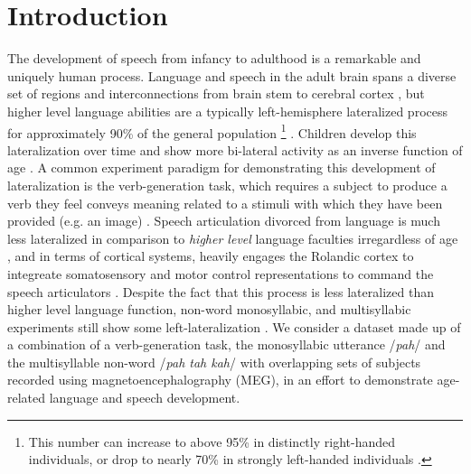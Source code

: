 \documentclass[utf8]{frontiersSCNS} %
\begin{document}
\section{Introduction}

The development of speech from infancy to adulthood is a remarkable and uniquely human process. Language and speech in the adult brain spans a diverse set of regions and interconnections from brain stem to cerebral cortex \cite{GuentherBook, Tourville2011, Hillis}, but higher level language abilities are a typically left-hemisphere lateralized process for approximately 90\% of the general population \footnote{This number can increase to above 95\% in distinctly right-handed individuals, or drop to nearly 70\% in strongly left-handed individuals \cite{GuentherBook}.} \cite{GuentherBook, Kadis2011, Yu2014}. Children develop this lateralization over time and show more bi-lateral activity as an inverse function of age \cite{Kadis2011, Ressel2008}. A common experiment paradigm for demonstrating this development of lateralization is the verb-generation task, which requires a subject to produce a verb they feel conveys meaning related to a stimuli with which they have been provided (e.g. an image) \cite{Kadis2011}. Speech articulation divorced from language is much less lateralized in comparison to {\em higher level} language faculties irregardless of age \cite{GuentherBook}, and in terms of cortical systems, heavily engages the Rolandic cortex to integreate somatosensory and motor control representations to command the speech articulators \cite{GuentherBook}. Despite the fact that this process is less lateralized than higher level language function, non-word monosyllabic, and multisyllabic experiments still show some left-lateralization \cite{Ghosh2008a}. We consider a dataset made up of a combination of a verb-generation task, the monosyllabic utterance /{\em pah}/ and the multisyllable non-word /{\em pah tah kah}/ with overlapping sets of subjects recorded using magnetoencephalography (MEG), in an effort to demonstrate age-related language and speech development. 
\end{document}
